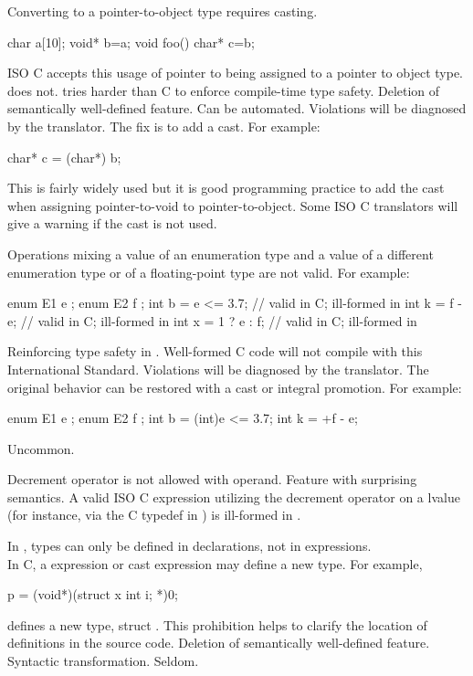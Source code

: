 \change
Converting  to a pointer-to-object type requires casting.
\begin{codeblock}
char a[10];
void* b=a;
void foo() {
  char* c=b;
}
\end{codeblock}

ISO C accepts this usage of pointer to  being assigned
to a pointer to object type.
\Cpp{} does not.
\rationale
\Cpp{} tries harder than C to enforce compile-time type safety.
\effect
Deletion of semantically well-defined feature.
\difficulty
Can be automated.
Violations will be diagnosed by the \Cpp{} translator.
The
fix is to add a  cast.
For example:
\begin{codeblock}
char* c = (char*) b;
\end{codeblock}

\howwide
This is fairly widely used but it is good
programming practice to add the cast when assigning pointer-to-void to pointer-to-object.
Some ISO C translators will give a warning
if the cast is not used.

\change
Operations mixing a value of an enumeration type and a value of a different
enumeration type or of a floating-point type are not valid.
For example:
\begin{codeblock}
enum E1 { e };
enum E2 { f };
int b = e <= 3.7;       // valid in C; ill-formed in \Cpp{}
int k = f - e;          // valid in C; ill-formed in \Cpp{}
int x = 1 ? e : f;      // valid in C; ill-formed in \Cpp{}
\end{codeblock}
\rationale
Reinforcing type safety in \Cpp{}.
\effect
Well-formed C code will not compile with this International Standard.
\difficulty
Violations will be diagnosed by the \Cpp{} translator.
The original behavior can be restored with a cast or integral promotion.
For example:
\begin{codeblock}
enum E1 { e };
enum E2 { f };
int b = (int)e <= 3.7;
int k = +f - e;
\end{codeblock}
\howwide
Uncommon.

\change
Decrement operator is not allowed with  operand.
\rationale
Feature with surprising semantics.
\effect
A valid ISO C expression utilizing the decrement operator on
a  lvalue
(for instance, via the C typedef in )
is ill-formed in \Cpp{}.

\change
In \Cpp{}, types can only be defined in declarations, not in expressions.\\
In C, a  expression or cast expression may define a new type.
For example,
\begin{codeblock}
p = (void*)(struct x {int i;} *)0;
\end{codeblock}
defines a new type, struct .
\rationale
This prohibition helps to clarify the location of
definitions in the source code.
\effect
Deletion of semantically well-defined feature.
\difficulty
Syntactic transformation.
\howwide
Seldom.

